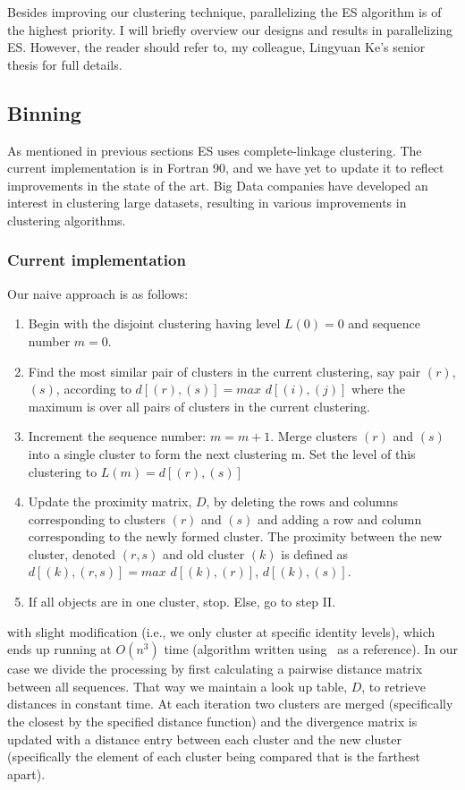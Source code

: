 Besides improving our clustering technique, parallelizing the ES algorithm is of the highest priority.
I will briefly overview our designs and results in parallelizing ES.
However, the reader should refer to, my colleague, Lingyuan Ke's senior thesis for full details.
\subsection*{Binning}
As mentioned in previous sections ES uses complete-linkage clustering.
The current implementation is in Fortran 90, and we have yet to update it to reflect improvements in the state of the art.
Big Data companies have developed an interest in clustering large datasets, resulting in various improvements in clustering algorithms.
\subsubsection*{Current implementation}
Our naive approach is as follows:
\begin{enumerate}[I]
\item Begin with the disjoint clustering having level $L(0) = 0$ and sequence number $m = 0$.
\item Find the most similar pair of clusters in the current clustering, say pair $(r)$, $(s)$, according to $d[(r),(s)] = max$ $d[(i),(j)]$ where the maximum is over all pairs of clusters in the current clustering.
\item Increment the sequence number: $m = m + 1$. Merge clusters $(r)$ and $(s)$ into a single cluster to form the next clustering m. Set the level of this clustering to $L(m) = d[(r),(s)]$
\item Update the proximity matrix, $D$, by deleting the rows and columns corresponding to clusters $(r)$ and $(s)$ and adding a row and column corresponding to the newly formed cluster. The proximity between the new cluster, denoted $(r,s)$ and old cluster $(k)$ is defined as $d[(k), (r,s)] = max$ $d[(k),(r)]$, $d[(k),(s)]$.
\item If all objects are in one cluster, stop. Else, go to step II.
\end{enumerate}
with slight modification (i.e., we only cluster at specific identity levels), which ends up running at $O(n^3)$ time (algorithm written using~\cite{FastClust} as a reference).
In our case we divide the processing by first calculating a pairwise distance matrix between all sequences.
That way we maintain a look up table, $D$, to retrieve distances in constant time.
At each iteration two clusters are merged (specifically the closest by the specified distance function) and the divergence matrix is updated with a distance entry between each cluster and the new cluster (specifically the element of each cluster being compared that is the farthest apart).

